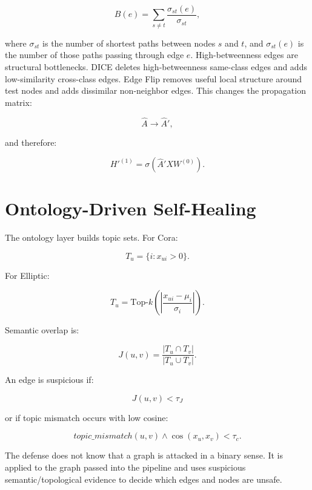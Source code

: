 \documentclass[12pt,oneside]{report}
\begin{document}
$$
B(e)=\sum_{s\neq t}\frac{\sigma_{st}(e)}{\sigma_{st}},
$$

where $\sigma_{st}$ is the number of shortest paths between nodes $s$ and $t$, and $\sigma_{st}(e)$ is the number of those paths passing through edge $e$. High-betweenness edges are structural bottlenecks. DICE deletes high-betweenness same-class edges and adds low-similarity cross-class edges. Edge Flip removes useful local structure around test nodes and adds dissimilar non-neighbor edges. This changes the propagation matrix:

$$
\hat{A}\rightarrow\hat{A}',
$$

and therefore:

$$
H'^{(1)}=\sigma(\hat{A}'XW^{(0)}).
$$

\section{Ontology-Driven Self-Healing}
The ontology layer builds topic sets. For Cora:

$$
T_u=\{i:x_{ui}>0\}.
$$

For Elliptic:

$$
T_u=\text{Top-}k\left(\left|\frac{x_{ui}-\mu_i}{\sigma_i}\right|\right).
$$

Semantic overlap is:

$$
J(u,v)=\frac{|T_u\cap T_v|}{|T_u\cup T_v|}.
$$

An edge is suspicious if:

$$
J(u,v)<\tau_J
$$

or if topic mismatch occurs with low cosine:

$$
topic\_mismatch(u,v)\land \cos(x_u,x_v)<\tau_c.
$$

The defense does not know that a graph is attacked in a binary sense. It is applied to the graph passed into the pipeline and uses suspicious semantic/topological evidence to decide which edges and nodes are unsafe.
\end{document}
